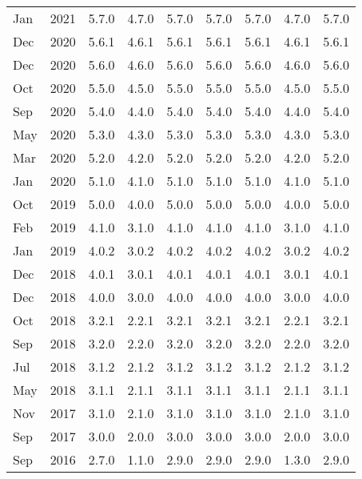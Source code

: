 \begin{xtabular}{|ll|c|c|c|c|c|c|c|}
Jan & 2021 & 5.7.0 & 4.7.0 & 5.7.0 & 5.7.0 & 5.7.0 & 4.7.0 & 5.7.0 \\
Dec & 2020 & 5.6.1 & 4.6.1 & 5.6.1 & 5.6.1 & 5.6.1 & 4.6.1 & 5.6.1 \\
Dec & 2020 & 5.6.0 & 4.6.0 & 5.6.0 & 5.6.0 & 5.6.0 & 4.6.0 & 5.6.0 \\
Oct & 2020 & 5.5.0 & 4.5.0 & 5.5.0 & 5.5.0 & 5.5.0 & 4.5.0 & 5.5.0 \\
Sep & 2020 & 5.4.0 & 4.4.0 & 5.4.0 & 5.4.0 & 5.4.0 & 4.4.0 & 5.4.0 \\
May & 2020 & 5.3.0 & 4.3.0 & 5.3.0 & 5.3.0 & 5.3.0 & 4.3.0 & 5.3.0 \\
Mar & 2020 & 5.2.0 & 4.2.0 & 5.2.0 & 5.2.0 & 5.2.0 & 4.2.0 & 5.2.0 \\
Jan & 2020 & 5.1.0 & 4.1.0 & 5.1.0 & 5.1.0 & 5.1.0 & 4.1.0 & 5.1.0 \\
Oct & 2019 & 5.0.0       & 4.0.0       & 5.0.0         & 5.0.0       & 5.0.0       & 4.0.0       & 5.0.0\\
Feb & 2019 & 4.1.0       & 3.1.0       & 4.1.0         & 4.1.0       & 4.1.0       & 3.1.0       & 4.1.0\\
Jan & 2019 & 4.0.2       & 3.0.2       & 4.0.2         & 4.0.2       & 4.0.2       & 3.0.2       & 4.0.2\\
Dec & 2018 & 4.0.1       & 3.0.1       & 4.0.1         & 4.0.1       & 4.0.1       & 3.0.1       & 4.0.1\\
Dec & 2018 & 4.0.0       & 3.0.0       & 4.0.0         & 4.0.0       & 4.0.0       & 3.0.0       & 4.0.0\\
Oct & 2018 & 3.2.1       & 2.2.1       & 3.2.1         & 3.2.1       & 3.2.1       & 2.2.1       & 3.2.1\\
Sep & 2018 & 3.2.0       & 2.2.0       & 3.2.0         & 3.2.0       & 3.2.0       & 2.2.0       & 3.2.0\\
Jul & 2018 & 3.1.2       & 2.1.2       & 3.1.2         & 3.1.2       & 3.1.2       & 2.1.2       & 3.1.2\\
May & 2018 & 3.1.1       & 2.1.1       & 3.1.1         & 3.1.1       & 3.1.1       & 2.1.1       & 3.1.1\\
Nov & 2017 & 3.1.0       & 2.1.0       & 3.1.0         & 3.1.0       & 3.1.0       & 2.1.0       & 3.1.0\\
Sep & 2017 & 3.0.0       & 2.0.0       & 3.0.0         & 3.0.0       & 3.0.0       & 2.0.0       & 3.0.0\\
Sep & 2016 & 2.7.0       & 1.1.0       & 2.9.0         & 2.9.0       & 2.9.0       & 1.3.0       & 2.9.0\\

\end{xtabular}
